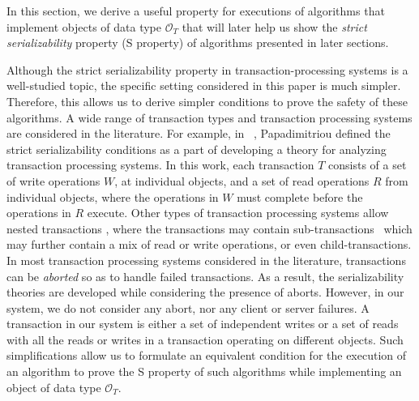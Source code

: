 In this section, we derive a useful property for  executions of  algorithms that implement  objects of data type $\mathcal{O}_T$  that will later  help us  show the \emph{strict serializability} property (S property) of algorithms presented in later sections.  

Although the strict serializability property in transaction-processing systems is a well-studied topic,  
the specific setting considered  in this paper is much simpler. Therefore, this allows  us to derive
 simpler conditions to prove the safety of these algorithms.  A wide range of transaction types and 
 transaction processing systems are considered in the literature. For example, in ~\cite{Papadimitriou79}, Papadimitriou   
defined the strict serializability conditions as a part of developing a  theory for analyzing transaction 
processing systems. In this work, each transaction $T$ consists of a set of write operations $W$, at 
individual objects, and a set of read operations $R$  from individual objects, where  the operations in 
$W$  must complete before the operations in $R$ execute.  
Other types of transaction processing systems allow nested transactions
\cite{Gary1993},
 where the transactions may contain sub-transactions~\cite{Bernstein:1987} which may 
further contain a mix of read or write operations, or even child-transactions. 
In most transaction processing systems considered in the literature,  transactions can be 
\emph{aborted} so as  to handle  failed  transactions. As a result, the serializability theories are 
developed  while  considering the presence of  aborts. 
However, in our system, we do not consider any abort, nor any  client or  server failures.  A transaction 
in our system is either a set of independent writes or a set of reads %
with 
all the reads or writes in a transaction operating on different  objects. Such simplifications allow us to 
formulate an equivalent condition for the execution of an algorithm  to prove the S  
property of such algorithms while  implementing an object of data type $\mathcal{O}_T$.

